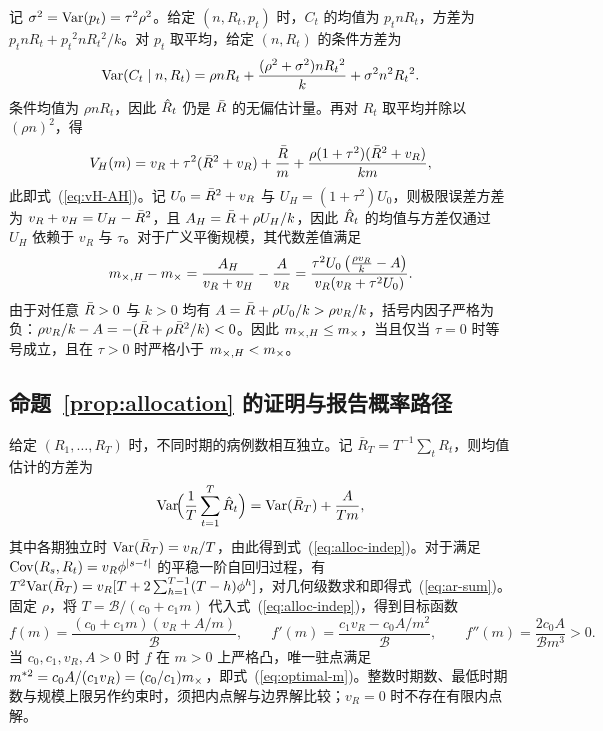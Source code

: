记 $\sigma^2=\mathrm{Var}(p_t)=\tau^2\rho^2$。给定 $(n,R_t,p_t)$ 时，$C_t$ 的均值为 $p_tnR_t$，方差为 $p_tnR_t+p_t{}^2nR_t{}^2/k$。对 $p_t$ 取平均，给定 $(n,R_t)$ 的条件方差为
\begin{equation}
  \mathrm{Var}(C_t\mid n,R_t)=\rho nR_t+\frac{(\rho^2+\sigma^2)nR_t{}^2}{k}+\sigma^2n^2R_t{}^2.
\end{equation}
条件均值为 $\rho nR_t$，因此 $\hat{R}_t$ 仍是 $\bar{R}$ 的无偏估计量。再对 $R_t$ 取平均并除以 $(\rho n)^2$，得
\begin{equation}
  V_H(m)=v_R+\tau^2(\bar{R}^2+v_R)+\frac{\bar{R}}{m}+\frac{\rho(1+\tau^2)(\bar{R}^2+v_R)}{km},
\end{equation}
此即式~(\ref{eq:vH-AH})。记 $U_0=\bar{R}{}^2+v_R$ 与 $U_H=(1+\tau^2)U_0$，则极限误差方差为 $v_R+v_H=U_H-\bar{R}{}^2$，且 $A_H=\bar{R}+\rho U_H/k$，因此 $\hat{R}_t$ 的均值与方差仅通过 $U_H$ 依赖于 $v_R$ 与 $\tau$。对于广义平衡规模，其代数差值满足
\begin{equation}
  m_{\times,H}-m_{\times} = \frac{A_H}{v_R+v_H} - \frac{A}{v_R} = \frac{\tau^2 U_0\left(\frac{\rho v_R}{k}-A\right)}{v_R(v_R+\tau^2 U_0)}.
\end{equation}
由于对任意 $\bar{R}>0$ 与 $k>0$ 均有 $A=\bar{R}+\rho U_0/k > \rho v_R/k$，括号内因子严格为负：$\rho v_R/k - A = -(\bar{R}+\rho\bar{R}^2/k)<0$。因此 $m_{\times,H}\le m_{\times}$，当且仅当 $\tau=0$ 时等号成立，且在 $\tau>0$ 时严格小于 $m_{\times,H}<m_{\times}$。

\subsection{命题~\ref{prop:allocation} 的证明与报告概率路径}
\label{app:prop3}

给定 $(R_1,\dots,R_T)$ 时，不同时期的病例数相互独立。记 $\bar{R}_T=T^{-1}\sum_tR_t$，则均值估计的方差为
\begin{equation}
  \mathrm{Var}\!\Big(\frac{1}{T}\sum_{t=1}^T\hat{R}_t\Big)=\mathrm{Var}(\bar{R}_T)+\frac{A}{Tm},
\end{equation}
其中各期独立时 $\mathrm{Var}(\bar{R}_T)=v_R/T$，由此得到式~(\ref{eq:alloc-indep})。对于满足 $\mathrm{Cov}(R_s,R_t)=v_R\phi^{|s-t|}$ 的平稳一阶自回归过程，有 $T^2\mathrm{Var}(\bar{R}_T)=v_R[T+2\sum_{h=1}^{T-1}(T-h)\phi^h]$，对几何级数求和即得式~(\ref{eq:ar-sum})\citep{hamilton1994time}。固定 $\rho$，将 $T=\mathcal{B}/(c_0+c_1m)$ 代入式~(\ref{eq:alloc-indep})，得到目标函数
\begin{equation}
  f(m)=\frac{(c_0+c_1m)(v_R+A/m)}{\mathcal{B}},\qquad
  f'(m)=\frac{c_1v_R-c_0A/m^2}{\mathcal{B}},\qquad
  f''(m)=\frac{2c_0A}{\mathcal{B}m^3}>0.
\end{equation}
当 $c_0,c_1,v_R,A>0$ 时 $f$ 在 $m>0$ 上严格凸，唯一驻点满足 $m^{*2}=c_0A/(c_1v_R)=(c_0/c_1)m_{\times}$，即式~(\ref{eq:optimal-m})。整数时期数、最低时期数与规模上限另作约束时，须把内点解与边界解比较；$v_R=0$ 时不存在有限内点解。

